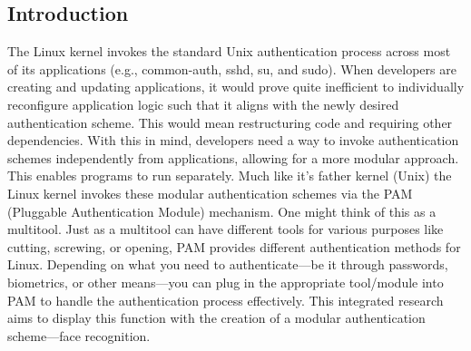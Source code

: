 \documentclass[
]{article}
\begin{document}
\begin{multicols}{2}

\section{Introduction}
The Linux kernel invokes the standard Unix authentication process across most of its applications (e.g., common-auth, sshd, su, and sudo). When developers are creating and updating applications, it would prove quite inefficient to individually reconfigure application logic such that it aligns with the newly desired authentication scheme. This would mean restructuring code and requiring other dependencies. With this in mind, developers need a way to invoke authentication schemes independently from applications, allowing for a more modular approach. This enables programs to run separately. Much like it's father kernel (Unix) the Linux kernel invokes these modular authentication schemes via the PAM (Pluggable Authentication Module) mechanism. One might think of this as a multitool. Just as a multitool can have different tools for various purposes like cutting, screwing, or opening, PAM provides different authentication methods for Linux. Depending on what you need to authenticate—be it through passwords, biometrics, or other means—you can plug in the appropriate tool/module into PAM to handle the authentication process effectively. This integrated research aims to display this function with the creation of a modular authentication scheme—face recognition.


\end{multicols}
\end{document}
